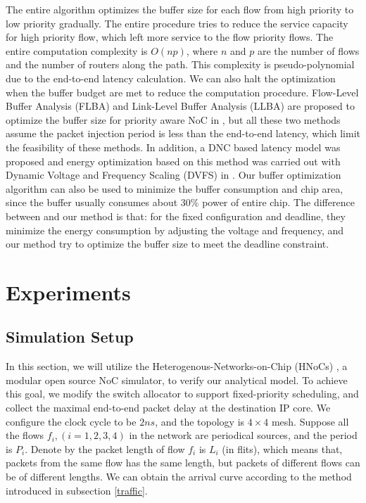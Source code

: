\documentclass[10pt,journal]{IEEEtran}
\begin{document}
The entire algorithm optimizes the buffer size for each flow from high priority to low priority gradually. The entire procedure tries to reduce the service capacity for high priority flow, which left more service to the flow priority flows. The entire computation complexity is $O(np)$, where $n$ and $p$ are the number of flows and the number of routers along the path. This complexity is pseudo-polynomial due to the end-to-end latency calculation. We can also halt the optimization when the buffer budget are met to reduce the computation procedure. Flow-Level Buffer Analysis (FLBA) and Link-Level Buffer Analysis (LLBA) are proposed to optimize the buffer size for priority aware NoC in \cite{189}, but all these two methods assume the packet injection period is less than the end-to-end latency, which limit the feasibility of these methods. In addition, a DNC based latency model was proposed and energy optimization based on this method was carried out with Dynamic Voltage and Frequency Scaling (DVFS) in \cite{6560630}. Our buffer optimization algorithm can also be used to minimize the buffer consumption and chip area, since the buffer usually consumes about 30\% power of entire chip.  The difference between \cite{6560630} and our method is that: for the fixed configuration and deadline, they minimize the energy consumption by adjusting the voltage and frequency, and our method try to optimize the buffer size to meet the deadline constraint.


\section{Experiments}\label{experiments}
\subsection{Simulation Setup}
In this section, we will utilize the Heterogenous-Networks-on-Chip (HNoCs) \cite{6404157}, a modular open source NoC simulator, to verify our analytical model. To achieve this goal, we modify the switch allocator to support fixed-priority scheduling, and collect the maximal end-to-end packet delay at the destination IP core. We configure the clock cycle to be $2ns$, and the topology is $4\times 4$ mesh. Suppose all the flows $f_i,(i=1,2,3,4)$ in the network are periodical sources, and the period is $P_i$. Denote by the packet length of flow $f_i$ is $L_i$ (in flits), which means that, packets from the same flow has the same length, but packets of different flows can be of different lengths. We can obtain the arrival curve according to the method introduced in subsection \ref{traffic}.
\end{document}
